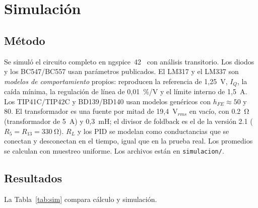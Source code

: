 \documentclass[conference]{IEEEtran}
\begin{document}
\section{Simulación}
\label{sec:sim}
\subsection{Método}
Se simuló el circuito completo en ngspice~42~\cite{ngspice} con análisis transitorio. Los diodos y los BC547/BC557 usan parámetros publicados. El LM317 y el LM337 son \emph{modelos de comportamiento} propios: reproducen la referencia de 1,25~V, $I_Q$, la caída mínima, la regulación de línea de 0,01~\%/V y el límite interno de 1,5~A. Los TIP41C/TIP42C y BD139/BD140 usan modelos genéricos con $h_{FE}\approx50$ y 80. El transformador es una fuente por mitad de 19,4~V$_{rms}$ en vacío, con \SI{0,2}{\ohm} (transformador de 5~A) y 0,3~mH; el divisor de foldback es el de la versión 2.1 ($R_5=R_{13}=\SI{330}{\ohm}$). $R_L$ y los PID se modelan como conductancias que se conectan y desconectan en el tiempo, igual que en la prueba real. Los promedios se calculan con muestreo uniforme. Los archivos están en \texttt{simulacion/}.

\subsection{Resultados}
La Tabla~\ref{tab:sim} compara cálculo y simulación.
\end{document}
